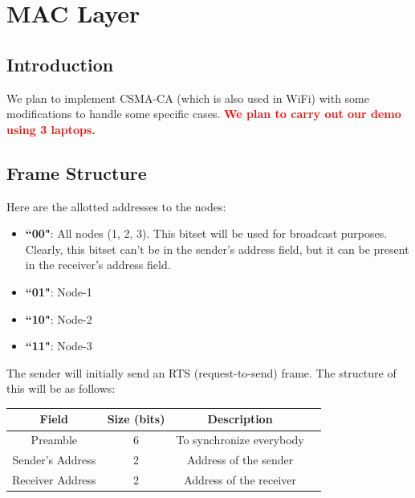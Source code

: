 \documentclass[a4paper,12pt]{article}
\begin{document}
\section{MAC Layer}

\subsection{Introduction}
We plan to implement CSMA-CA (which is also used in WiFi) with some modifications to handle some specific cases. \textcolor{red}{\bf 
 We plan to carry out our demo using 3 laptops.}

\subsection{Frame Structure}
Here are the allotted addresses to the nodes:
\begin{itemize}
    \item {\bf ``00"}: All nodes (1, 2, 3). This bitset will be used for broadcast purposes. Clearly, this bitset can't be in the sender's address field, but it can be present in the receiver's address field.
    \item {\bf ``01"}: Node-1
    \item {\bf ``10"}: Node-2
    \item {\bf ``11"}: Node-3
\end{itemize}

The sender will initially send an RTS (request-to-send) frame. The structure of this will be as follows:
\begin{center}
    \begin{tabular}{|c|c|c|c|}
    \hline
    \textbf{Field} & \textbf{Size (bits)} & \textbf{Description} \\ 
    \hline
    Preamble & 6 & To synchronize everybody  \\ 
    \hline
    Sender's Address & 2 & Address of the sender \\ 
    \hline
    Receiver Address & 2 & Address of the receiver\\ 
    \hline
    \end{tabular}
\end{center}
\end{document}
